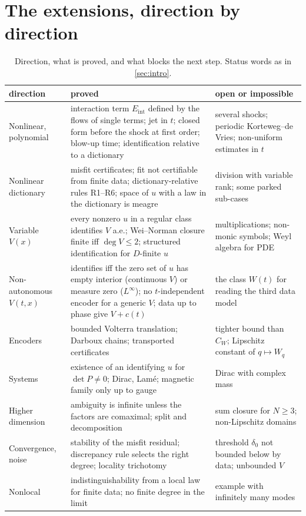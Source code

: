 \section{The extensions, direction by direction}\label{sec:directions}
\begin{table}[tbp]
\centering\small
\caption{Direction, what is proved, and what blocks the next step. Status words as in \cref{sec:intro}.}\label{tab:directions}
\begin{tabular}{@{}p{2.5cm}p{5.6cm}p{4.2cm}@{}}
\toprule
direction & proved & open or impossible\\
\midrule
Nonlinear, polynomial & interaction term $E_{\mathrm{int}}$ defined by the flows of single terms; jet in $t$; closed form before the shock at first order; blow-up time; identification relative to a dictionary & several shocks; periodic Korteweg--de Vries; non-uniform estimates in $t$\\
Nonlinear dictionary & misfit certificates; fit not certifiable from finite data; dictionary-relative rules R1--R6; space of $u$ with a law in the dictionary is meagre & division with variable rank; some parked sub-cases\\
Variable $V(x)$ & every nonzero $u$ in a regular class identifies $V$ a.e.; Wei--Norman closure finite iff $\deg V\le2$; structured identification for $D$-finite $u$ & multiplications; non-monic symbols; Weyl algebra for PDE\\
Non-autonomous $V(t,x)$ & identifies iff the zero set of $u$ has empty interior (continuous $V$) or measure zero ($L^\infty$); no $t$-independent encoder for a generic $V$; data up to phase give $V+c(t)$ & the class $W(t)$ for reading the third data model\\
Encoders & bounded Volterra translation; Darboux chains; transported certificates & tighter bound than $C_W$; Lipschitz constant of $q\mapsto W_q$\\
Systems & existence of an identifying $u$ for $\det P\neq0$; Dirac, Lam\'e; magnetic family only up to gauge & Dirac with complex mass\\
Higher dimension & ambiguity is infinite unless the factors are comaximal; split and decomposition & sum closure for $N\ge3$; non-Lipschitz domains\\
Convergence, noise & stability of the misfit residual; discrepancy rule selects the right degree; locality trichotomy & threshold $\delta_0$ not bounded below by data; unbounded $V$\\
Nonlocal & indistinguishability from a local law for finite data; no finite degree in the limit & example with infinitely many modes\\
\bottomrule
\end{tabular}
\end{table}

